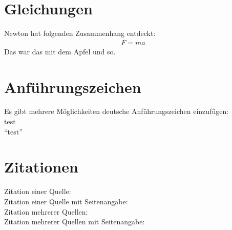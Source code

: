 \cleardoublepage


\section*{Gleichungen}
\label{sec:gleichungen}

Newton hat folgenden Zusammenhang entdeckt:
\begin{align}
    F = m a
    \label{eqn:newton}
\end{align}
Das war das mit dem Apfel und so.

\section*{Anführungszeichen}
\label{sec:anfuehrungszeichen}
Es gibt mehrere Möglichkeiten deutsche Anführungszeichen einzufügen:\\
\glqq test\grqq\\
"`test"'\\


\section*{Zitationen}

Zitation einer Quelle: \cite{Mustermann.2012}\\
Zitation einer Quelle mit Seitenangabe: \cite[12-16]{Mustermann.2012}\\
Zitation mehrerer Quellen: \cites{Mustermann.2012}{Musterfrau.2011}\\
Zitation mehrerer Quellen mit Seitenangabe: \cites[12-16]{Mustermann.2012}[3]{Musterfrau.2011}\\
